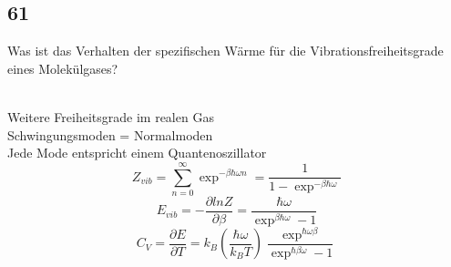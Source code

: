 \documentclass[12pt,a4paper]{report}
\newenvironment{myfrag}{\begin{it}}{\end{it}\vspace{3mm}\par}
\numberwithin{equation}{section}
\begin{document}
\subsection{61}
\begin{myfrag}
Was ist das Verhalten der spezifischen Wärme für die Vibrationsfreiheitsgrade
eines Molekülgases?
\end{myfrag} \quad \\
Weitere Freiheitsgrade im realen Gas \\
Schwingungsmoden = Normalmoden \\
Jede Mode entspricht einem Quantenoszillator
$$ Z_{vib} = \sum \limits _{n=0} ^\infty \exp ^{ -\beta \hbar \omega n} = \dfrac{1}{1-\exp ^{-\beta \hbar \omega}}$$
$$ E_{vib}= - \dfrac{\partial lnZ}{\partial \beta} = \dfrac{\hbar \omega}{\exp ^{\beta \hbar \omega }-1}$$
$$ C_V = \dfrac{\partial E}{\partial T} = k_B \left( \dfrac{\hbar \omega }{k_B T} \right) \dfrac{\exp ^{\hbar \omega \beta }}{\exp ^{\hbar \beta \omega } -1}$$
\end{document}
